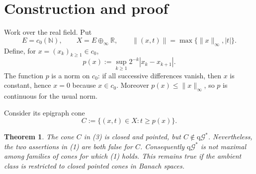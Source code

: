 \documentclass[11pt]{article}
\newtheorem{theorem}{Theorem}
\newcommand{\R}{\mathbb R}
\newcommand{\N}{\mathbb N}
\newcommand{\qG}{\mathrm{q}\mathcal G^*}
\begin{document}
\section{Construction and proof}

Work over the real field.  Put
\[
 E=c_0(\N),
 \qquad
 X=E\oplus_\infty\R,
 \qquad
 \|(x,t)\|=\max\{\|x\|_\infty,|t|\}.
\]
Define, for $x=(x_k)_{k\geq1}\in c_0$,
\[
 p(x):=\sup_{k\geq1}2^{-k}|x_k-x_{k+1}|.                \tag{2}
\]
The function $p$ is a norm on $c_0$: if all successive differences vanish,
then $x$ is constant, hence $x=0$ because $x\in c_0$.  Moreover
$p(x)\leq\|x\|_\infty$, so $p$ is continuous for the usual norm.

Consider its epigraph cone
\[
 C:=\{(x,t)\in X:t\geq p(x)\}.                           \tag{3}
\]

\begin{theorem}\label{thm:main}
The cone $C$ in \emph{(3)} is closed and pointed, but $C\notin\qG$.
Nevertheless, the two assertions in \emph{(1)} are both false for $C$.
Consequently $\qG$ is not maximal among families of cones for which
\emph{(1)} holds.  This remains true if the ambient class is restricted to
closed pointed cones in Banach spaces.
\end{theorem}
\end{document}
